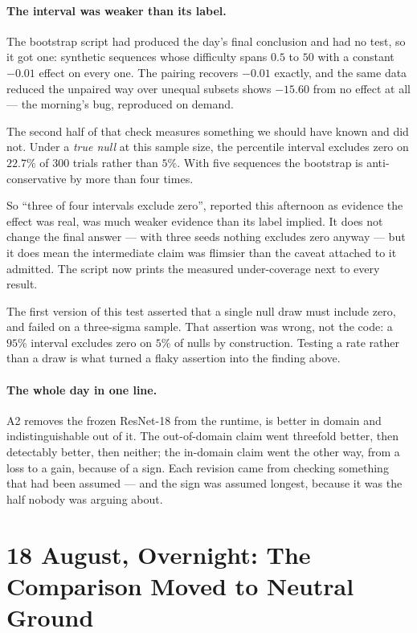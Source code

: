 \documentclass[11pt,a4paper]{article}
\begin{document}
\paragraph{The interval was weaker than its label.} The bootstrap script
had produced the day's final conclusion and had no test, so it got one:
synthetic sequences whose difficulty spans $0.5$ to $50$ with a constant
$-0.01$ effect on every one. The pairing recovers $-0.01$ exactly, and the
same data reduced the unpaired way over unequal subsets shows $-15.60$
from no effect at all --- the morning's bug, reproduced on demand.

The second half of that check measures something we should have known and
did not. Under a \emph{true null} at this sample size, the percentile
interval excludes zero on $22.7\%$ of $300$ trials rather than $5\%$. With
five sequences the bootstrap is anti-conservative by more than four times.

So ``three of four intervals exclude zero'', reported this afternoon as
evidence the effect was real, was much weaker evidence than its label
implied. It does not change the final answer --- with three seeds nothing
excludes zero anyway --- but it does mean the intermediate claim was
flimsier than the caveat attached to it admitted. The script now prints
the measured under-coverage next to every result.

The first version of this test asserted that a single null draw must
include zero, and failed on a three-sigma sample. That assertion was
wrong, not the code: a $95\%$ interval excludes zero on $5\%$ of nulls by
construction. Testing a rate rather than a draw is what turned a flaky
assertion into the finding above.

\paragraph{The whole day in one line.} A2 removes the frozen ResNet-18
from the runtime, is better in domain and indistinguishable out of it.
The out-of-domain claim went threefold better, then detectably better,
then neither; the in-domain claim went the other way, from a loss to a
gain, because of a sign. Each revision came from checking something that
had been assumed --- and the sign was assumed longest, because it was the
half nobody was arguing about.


\section*{18 August, Overnight: The Comparison Moved to Neutral Ground}
\end{document}
